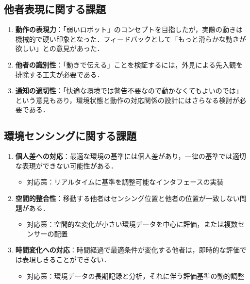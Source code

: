 \documentclass{cuxarticle}
\begin{document}
\subsection{他者表現に関する課題}
\begin{enumerate}
  \item \textbf{動作の表現力}：「弱いロボット」のコンセプトを目指したが，実際の動きは機械的で硬い印象となった．フィードバックとして「もっと滑らかな動きが欲しい」との意見があった．

  \item \textbf{他者の識別性}：「動きで伝える」ことを検証するには，外見による先入観を排除する工夫が必要である．

  \item \textbf{通知の適切性}：「快適な環境では警告不要なので動かなくてもよいのでは」という意見もあり，環境状態と動作の対応関係の設計にはさらなる検討が必要である．
\end{enumerate}

\subsection{環境センシングに関する課題}
\begin{enumerate}
  \item \textbf{個人差への対応}：最適な環境の基準には個人差があり，一律の基準では適切な表現ができない可能性がある．
    \begin{itemize}
      \item 対応策：リアルタイムに基準を調整可能なインタフェースの実装
    \end{itemize}

  \item \textbf{空間的整合性}：移動する他者はセンシング位置と他者の位置が一致しない問題がある．
    \begin{itemize}
      \item 対応策：空間的な変化が小さい環境データを中心に評価，または複数センサーの配置
    \end{itemize}

  \item \textbf{時間変化への対応}：時間経過で最適条件が変化する他者は，即時的な評価では表現しきることができない．
    \begin{itemize}
      \item 対応策：環境データの長期記録と分析，それに伴う評価基準の動的調整
    \end{itemize}
\end{enumerate}
\end{document}
